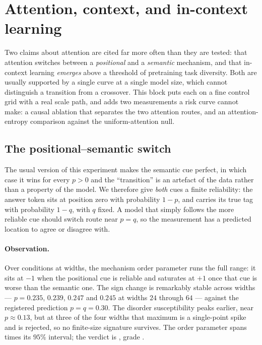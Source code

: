 \section{Attention, context, and in-context learning}
\label{sec:sequence}

Two claims about attention are cited far more often than they are tested: that
attention switches between a \emph{positional} and a \emph{semantic} mechanism,
and that in-context learning \emph{emerges} above a threshold of pretraining
task diversity. Both are usually supported by a single curve at a single model
size, which cannot distinguish a transition from a crossover. This block puts
each on a fine control grid with a real scale path, and adds two measurements a
risk curve cannot make: a causal ablation that separates the two attention
routes, and an attention-entropy comparison against the uniform-attention null.

\subsection{The positional--semantic switch}


The usual version of this experiment makes the semantic cue perfect, in which
case it wins for every $p>0$ and the ``transition'' is an artefact of the data
rather than a property of the model. We therefore give \emph{both} cues a
finite reliability: the answer token sits at position zero with probability
$1-p$, and carries its true tag with probability $1-q$, with $q$ fixed. A model
that simply follows the more reliable cue should switch route near $p=q$, so
the measurement has a predicted location to agree or disagree with.

\paragraph{Observation.}
Over \AtlasPositionalSemanticConditions{} conditions at
\AtlasPositionalSemanticSizes{} widths, the mechanism order parameter runs the
full range: it sits at $-1$ when the positional cue is reliable and saturates at
$+1$ once that cue is worse than the semantic one. The sign change is
remarkably stable across widths --- $p=0.235$, $0.239$, $0.247$ and $0.245$ at
widths $24$ through $64$ --- against the registered prediction $p=q=0.30$. The
disorder susceptibility peaks earlier, near $p\approx0.13$, but at three of the
four widths that maximum is a single-point spike and is rejected, so no
finite-size signature survives. The order parameter spans
\AtlasPositionalSemanticSemanticRatio{} times its $95\%$ interval; the verdict
is \emph{\AtlasPositionalSemanticVerdict{}}, grade
\AtlasPositionalSemanticGrade{}.

